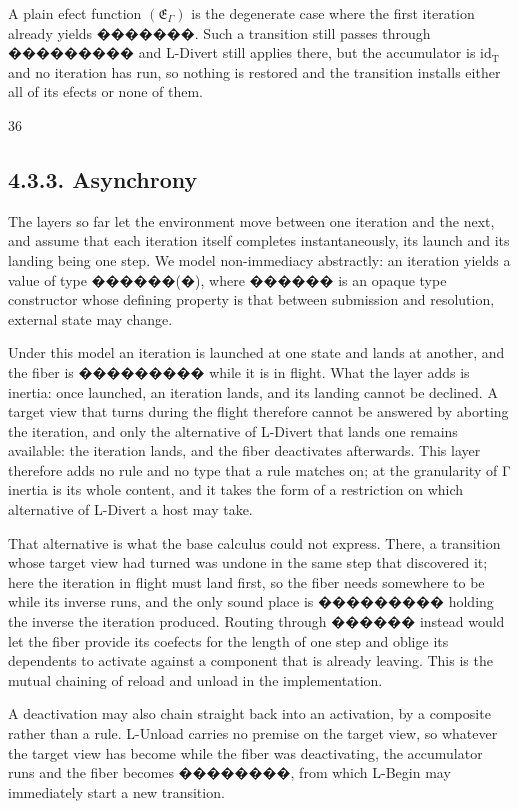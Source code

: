\documentclass[
  10
]{article}
\newcounter{none} %
\begin{document}
A plain efect function \(( { \mathfrak { E } } _ { \Gamma } )\) is the
degenerate case where the first iteration already yields �������. Such a
transition still passes through ��������� and L-Divert still applies
there, but the accumulator is \(\mathrm { i d _ { T } }\) and no
iteration has run, so nothing is restored and the transition installs
either all of its efects or none of them.

36

\subsection{4.3.3. Asynchrony}\label{asynchrony}

The layers so far let the environment move between one iteration and the
next, and assume that each iteration itself completes instantaneously,
its launch and its landing being one step. We model non-immediacy
abstractly: an iteration yields a value of type ������(�), where ������
is an opaque type constructor whose defining property is that between
submission and resolution, external state may change.

Under this model an iteration is launched at one state and lands at
another, and the fiber is ��������� while it is in flight. What the
layer adds is inertia: once launched, an iteration lands, and its
landing cannot be declined. A target view that turns during the flight
therefore cannot be answered by aborting the iteration, and only the
alternative of L-Divert that lands one remains available: the iteration
lands, and the fiber deactivates afterwards. This layer therefore adds
no rule and no type that a rule matches on; at the granularity of Γ
inertia is its whole content, and it takes the form of a restriction on
which alternative of L-Divert a host may take.

That alternative is what the base calculus could not express. There, a
transition whose target view had turned was undone in the same step that
discovered it; here the iteration in flight must land first, so the
fiber needs somewhere to be while its inverse runs, and the only sound
place is ��������� holding the inverse the iteration produced. Routing
through ������ instead would let the fiber provide its coefects for the
length of one step and oblige its dependents to activate against a
component that is already leaving. This is the mutual chaining of reload
and unload in the implementation.

A deactivation may also chain straight back into an activation, by a
composite rather than a rule. L-Unload carries no premise on the target
view, so whatever the target view has become while the fiber was
deactivating, the accumulator runs and the fiber becomes ��������, from
which L-Begin may immediately start a new transition.
\end{document}
